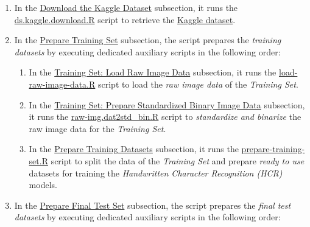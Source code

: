 \documentclass[
]{report}
\providecommand{\tightlist}{%
  \setlength{\itemsep}{0pt}\setlength{\parskip}{0pt}}
\begin{document}
\begin{enumerate}
\def\labelenumi{\arabic{enumi}.}
\tightlist
\item
  In the \href{https://github.com/AzKurban-edX-DS/edx.capstone.choose-your-own/blob/main/r/index.R\#L22-L32}{Download the Kaggle Dataset} subsection, it runs the \hyperref[appndx_b.ds.kaggle.download]{ds.kaggle.download.R} script to retrieve the \href{https://www.kaggle.com/datasets/vaibhao/handwritten-characters}{Kaggle dataset}.
\item
  In the \href{https://github.com/AzKurban-edX-DS/edx.capstone.choose-your-own/blob/main/r/index.R\#L33-L109}{Prepare Training Set} subsection, the script prepares the \emph{training datasets} by executing dedicated auxiliary scripts in the following order:

  \begin{enumerate}
  \def\labelenumii{\arabic{enumii}.}
  \tightlist
  \item
    In the \href{https://github.com/AzKurban-edX-DS/edx.capstone.choose-your-own/blob/main/r/index.R\#L38-L58}{Training Set: Load Raw Image Data} subsection, it runs the \href{https://github.com/AzKurban-edX-DS/edx.capstone.choose-your-own/blob/main/r/support-scripts/load-raw-image-data.R}{load-raw-image-data.R} script to load the \emph{raw image data} of the \emph{Training Set}.
  \item
    In the \href{https://github.com/AzKurban-edX-DS/edx.capstone.choose-your-own/blob/main/r/index.R\#L59-L99}{Training Set: Prepare Standardized Binary Image Data} subsection, it runs the \href{https://github.com/AzKurban-edX-DS/edx.capstone.choose-your-own/blob/main/r/support-scripts/raw-img.dat2std_bin.R}{raw-img.dat2std\_bin.R} script to \emph{standardize and binarize} the raw image data for the \emph{Training Set}.
  \item
    In the \href{https://github.com/AzKurban-edX-DS/edx.capstone.choose-your-own/blob/main/r/index.R\#L100-L109}{Prepare Training Datasets} subsection, it runs the \hyperref[appndx_b.prepare_training_set]{prepare-training-set.R} script to split the data of the \emph{Training Set} and prepare \emph{ready to use} datasets for training the \emph{Handwritten Character Recognition (HCR)} models.
  \end{enumerate}
\item
  In the \href{https://github.com/AzKurban-edX-DS/edx.capstone.choose-your-own/blob/main/r/index.R\#L110-L160}{Prepare Final Test Set} subsection, the script prepares the \emph{final test datasets} by executing dedicated auxiliary scripts in the following order:


\end{enumerate}
\end{document}
